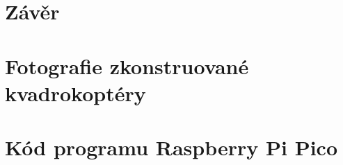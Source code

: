 \documentclass[12pt]{report}
\begin{document}
\lipsum[1]

\chapter*{Závěr}
	
\lipsum[1]
	
\nocite{*}
\printbibliography					%
\printglossary[title={Zkratky}]		%
\listoffigures						%
\listoftables						%

\begin{appendices}
	\chapter{Fotografie zkonstruované kvadrokoptéry}	
	\lipsum[1]
	\chapter{Kód programu Raspberry Pi Pico}  
\end{appendices}
\end{document}
